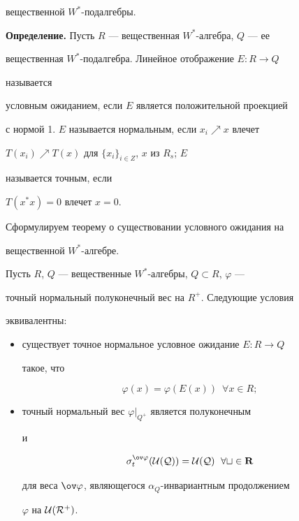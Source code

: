 вещественной $W^*$-подалгебры. 


\medskip 


 


{\bf Определение.} Пусть $R$ --- вещественная $W^*$-алгебра, $Q$ --- ее 


вещественная $W^*$-подалгебра. Линейное отображение $E:R\to Q$ 


называется 


условным ожиданием, если $E$ является положительной проекцией 


с нормой 1.\; $E$ называется нормальным, если $x_i\nearrow x$ влечет 


$T(x_i)\nearrow T(x)$ для $\{x_i\}_{i\in Z}$, $x$ из $R_s$; $E$ 


называется точным, если 


$T(x^*x)=0$ влечет $x=0$. 


\medskip 


 


Сформулируем теорему о существовании условного ожидания на 


вещественной $W^*$-алгебре. 


 


\begin{thm} 


Пусть $R$, $Q$ --- вещественные $W^*$-алгебры, $Q\subset R$, $\varphi$ --- 


точный нормальный полуконечный вес на $R^+$. Следующие условия 


эквивалентны$:$ 


\begin{itemize} 


\item[1)] существует точное нормальное условное ожидание $E:R\to Q$ 


такое, что 


$$ 


\varphi(x)=\varphi(E(x))\ \; \forall x\in R; 


$$ 


\item[2)] точный нормальный вес $\varphi|_{Q^+}$ является полуконечным 


и 


$$ 


\sigma^{\ov\varphi}_t(\cal U(Q))=\cal U(Q)\ \; \forall t\in\bold R 


$$ 


для веса $\ov\varphi$, являющегося $\alpha_Q$-инвариантным продолжением 


$\varphi$ на $\cal U(R^+)$. 


\end{itemize} 


\end{thm} 


